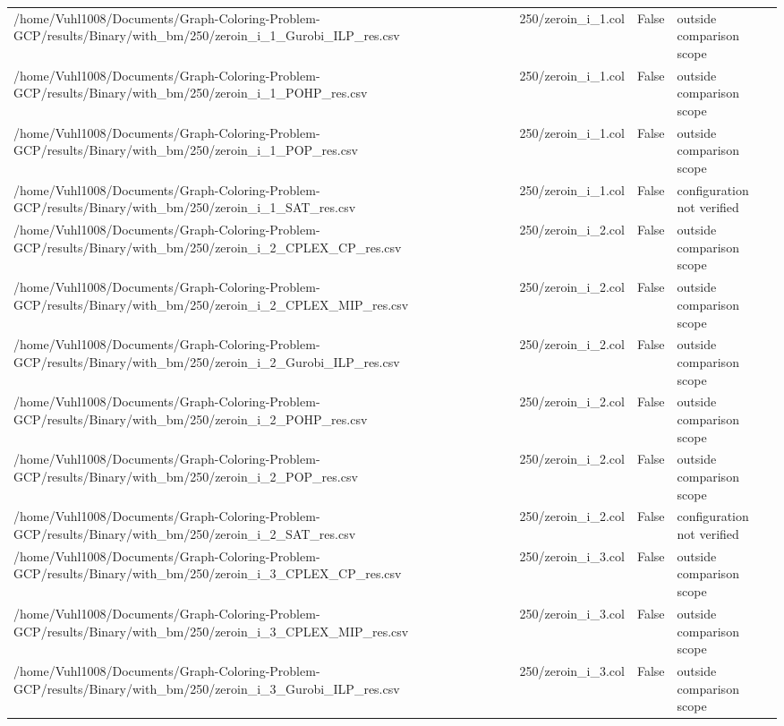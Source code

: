 \begin{table}[htbp]
\begin{tabular}{llll}
/home/Vuhl1008/Documents/Graph-Coloring-Problem-GCP/results/Binary/with\_bm/250/zeroin\_i\_1\_Gurobi\_ILP\_res.csv & 250/zeroin\_i\_1.col & False & outside comparison scope \\
/home/Vuhl1008/Documents/Graph-Coloring-Problem-GCP/results/Binary/with\_bm/250/zeroin\_i\_1\_POHP\_res.csv & 250/zeroin\_i\_1.col & False & outside comparison scope \\
/home/Vuhl1008/Documents/Graph-Coloring-Problem-GCP/results/Binary/with\_bm/250/zeroin\_i\_1\_POP\_res.csv & 250/zeroin\_i\_1.col & False & outside comparison scope \\
/home/Vuhl1008/Documents/Graph-Coloring-Problem-GCP/results/Binary/with\_bm/250/zeroin\_i\_1\_SAT\_res.csv & 250/zeroin\_i\_1.col & False & configuration not verified \\
/home/Vuhl1008/Documents/Graph-Coloring-Problem-GCP/results/Binary/with\_bm/250/zeroin\_i\_2\_CPLEX\_CP\_res.csv & 250/zeroin\_i\_2.col & False & outside comparison scope \\
/home/Vuhl1008/Documents/Graph-Coloring-Problem-GCP/results/Binary/with\_bm/250/zeroin\_i\_2\_CPLEX\_MIP\_res.csv & 250/zeroin\_i\_2.col & False & outside comparison scope \\
/home/Vuhl1008/Documents/Graph-Coloring-Problem-GCP/results/Binary/with\_bm/250/zeroin\_i\_2\_Gurobi\_ILP\_res.csv & 250/zeroin\_i\_2.col & False & outside comparison scope \\
/home/Vuhl1008/Documents/Graph-Coloring-Problem-GCP/results/Binary/with\_bm/250/zeroin\_i\_2\_POHP\_res.csv & 250/zeroin\_i\_2.col & False & outside comparison scope \\
/home/Vuhl1008/Documents/Graph-Coloring-Problem-GCP/results/Binary/with\_bm/250/zeroin\_i\_2\_POP\_res.csv & 250/zeroin\_i\_2.col & False & outside comparison scope \\
/home/Vuhl1008/Documents/Graph-Coloring-Problem-GCP/results/Binary/with\_bm/250/zeroin\_i\_2\_SAT\_res.csv & 250/zeroin\_i\_2.col & False & configuration not verified \\
/home/Vuhl1008/Documents/Graph-Coloring-Problem-GCP/results/Binary/with\_bm/250/zeroin\_i\_3\_CPLEX\_CP\_res.csv & 250/zeroin\_i\_3.col & False & outside comparison scope \\
/home/Vuhl1008/Documents/Graph-Coloring-Problem-GCP/results/Binary/with\_bm/250/zeroin\_i\_3\_CPLEX\_MIP\_res.csv & 250/zeroin\_i\_3.col & False & outside comparison scope \\
/home/Vuhl1008/Documents/Graph-Coloring-Problem-GCP/results/Binary/with\_bm/250/zeroin\_i\_3\_Gurobi\_ILP\_res.csv & 250/zeroin\_i\_3.col & False & outside comparison scope \\

\end{tabular}
\end{table}
